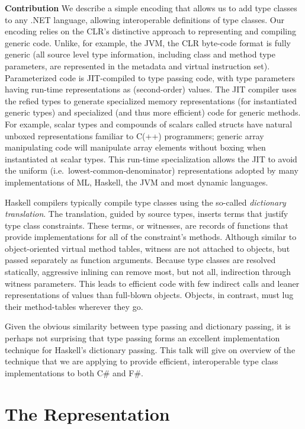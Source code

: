 \documentclass[preprint]{sig-alternate-05-2015}
\begin{document}
{\bf Contribution} We describe a simple encoding that allows us to add type classes to
any .NET language, allowing interoperable definitions of type
classes. Our encoding relies on the CLR's distinctive approach to
representing and compiling generic code\cite{genericspldi,genericspopl}. Unlike, for example, the JVM, the CLR
byte-code format is fully generic (all source level type information,
including class and method type parameters, are represented in the
metadata and virtual instruction set).  Parameterized code is JIT-compiled to type passing code,
with type parameters having run-time representations as (second-order)
values.  The JIT compiler uses the refied types to generate
specialized memory representations (for instantiated generic types)
and specialized (and thus more efficient) code for generic
methods. For example, scalar types and compounds of scalars called
structs have natural unboxed representations familiar to C(++)
programmers; generic array manipulating code will manipulate array
elements without boxing when instantiated at scalar types.  This run-time
specialization allows the JIT to avoid the uniform (i.e.\ lowest-common-denominator) representations adopted by many implementations of ML, 
Haskell, the JVM and most dynamic languages.

Haskell compilers typically compile type classes using the so-called
\emph{dictionary translation}.  The translation, guided by source
types, inserts terms that justify type class constraints. These terms,
or witnesses, are records of functions that provide implementations
for all of the constraint's methods. Although similar to
object-oriented virtual method tables, witness are not attached to
objects, but passed separately as function arguments.  Because type
classes are resolved statically, aggressive inlining can remove most,
but not all, indirection through witness parameters. This leads to
efficient code with few indirect calls and leaner representations of values than full-blown objects. Objects, in contrast, must lug their method-tables wherever they go.

Given the obvious similarity between type passing and dictionary
passing, it is perhaps not surprising that type passing forms an
excellent implementation technique for Haskell's dictionary passing. 
This talk will give on overview of the technique that we are applying to provide
efficient, interoperable type class implementations to both C\# and F\#.


\section{The Representation}
\end{document}
